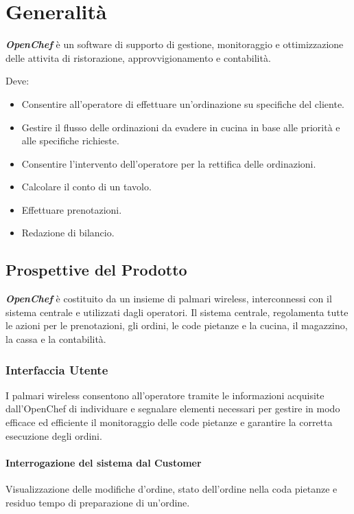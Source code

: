\chapter{Generalit\`a}
{\bf \emph{OpenChef}} \`e un software di supporto di gestione, monitoraggio e 
ottimizzazione delle attivita di ristorazione, approvvigionamento e contabilit\`a.
  
Deve:
\begin{itemize}
      \item Consentire all'operatore di effettuare un'ordinazione su specifiche del cliente.
      \item Gestire il flusso delle ordinazioni da evadere in cucina in base alle priorit\`a 
          e alle specifiche richieste.
      \item Consentire l'intervento dell'operatore per la rettifica delle ordinazioni.
      \item Calcolare il conto di un tavolo.
      \item Effettuare prenotazioni.
      \item Redazione di bilancio.
 \end{itemize}

\section{Prospettive del Prodotto}
    
{\bf \emph{OpenChef}} \`e costituito da un insieme di palmari wireless, interconnessi 
con il  sistema centrale e utilizzati dagli operatori.
Il sistema centrale, regolamenta tutte le azioni per le prenotazioni, gli ordini, 
le code pietanze e la cucina, il magazzino, la cassa e la contabilit\`a.

\subsection{Interfaccia Utente}

I palmari wireless consentono all'operatore tramite le informazioni acquisite dall'OpenChef 
di individuare e  segnalare elementi necessari per gestire in modo efficace ed efficiente 
il monitoraggio delle code pietanze e garantire la corretta esecuzione degli ordini.

\subsubsection{Interrogazione del sistema dal Customer}

Visualizzazione delle modifiche d'ordine, stato dell'ordine nella coda pietanze e residuo 
tempo di preparazione di un'ordine.

